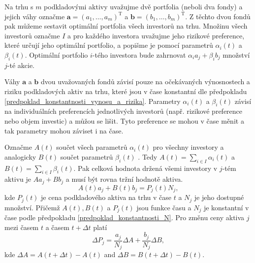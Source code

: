 \documentclass[a4paper,12pt]{report}
\theoremstyle{definition} \newtheorem{definice}[veta]{Definice}
\theoremstyle{remark}
\begin{document}
Na trhu s $m$ podkladovými aktivy uvažujme dvě portfolia (neboli dva fondy) a jejich váhy označme $\boldsymbol{a}=(a_1,\dots,a_m)^\mathrm{T}$ a $\boldsymbol{b}=(b_1,\dots,b_m)^\mathrm{T}$. Z těchto dvou fondů pak můžeme sestavit optimální portfolia všech investorů na trhu.
Množinu všech investorů označme $I$ a pro každého investora uvažujme jeho rizikové preference, které určují jeho optimální portfolio, a popišme je pomocí parametrů $\alpha_i(t)$ a $\beta_i(t)$.
Optimální portfolio $i$-tého investora bude zahrnovat $\alpha_ia_j+\beta_ib_j$ množství $j$-té akcie.

Váhy $\boldsymbol{a}$ a  $\boldsymbol{b}$ dvou uvažovaných fondů závisí pouze na očekávaných vý\-nos\-nostech a riziku podkladových aktiv na trhu, které jsou v čase konstantní dle předpokladu \ref{predpoklad_konstantnosti_vynosu_a_rizika}.
Parametry $\alpha_i(t)$ a $\beta_i(t)$ závisí na individuálních preferencích jednotlivých investorů (např. rizikové preference nebo objem investic) a můžou se lišit. Tyto preference se mohou v čase měnit a tak parametry mohou záviset i na čase.

Označme $A(t)$ součet všech parametrů $\alpha_i(t)$ pro všechny investory a analogicky $B(t)$ součet parametrů $\beta_i(t)$ .
Tedy $A(t)=\sum_{i\in I}\alpha_i(t)$ a $B(t)=\sum_{i\in I}\beta_i(t)$.
Pak celková hodnota držená všemi investory v $j$-tém aktivu je $Aa_j+Bb_j$ a musí být rovna tržní hodnotě aktiva.
$$A(t)a_j+B(t)b_j=P_j(t)N_j,$$
kde $P_j(t)$ je cena podkladového aktiva na trhu v čase $t$ a $N_j$ je jeho dostupné množství.
Přičemž $A(t),B(t)$ a $ P_j(t)$ jsou funkce času a $N_j$ je konstantní v čase podle předpokladu \ref{predpoklad_konstantnosti_N}.
Pro změnu ceny aktiva $j$ mezi časem $t$ a časem $t+\Delta t$ platí
\begin{displaymath}
\Delta P_j = \frac{a_j}{N_j}\Delta A + \frac{b_j}{N_j}\Delta B,
\end{displaymath}
kde $\Delta A = A(t+\Delta t) - A(t)$ and $\Delta B = B(t+\Delta t)- B(t)$.
\end{document}
